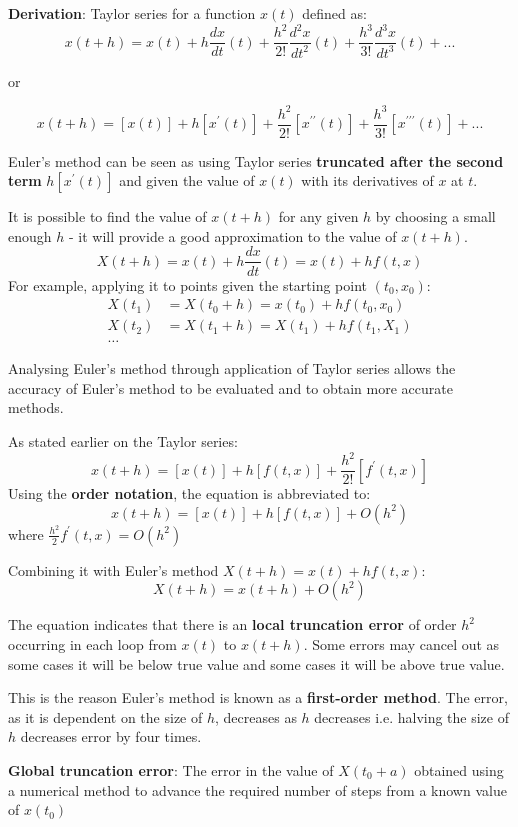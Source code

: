 \documentclass[10pt,a4paper]{article}
\begin{document}
\textbf{Derivation}: Taylor series for a function $x(t)$ defined as:
$$
    x(t+h)=x(t)+h\frac{dx}{dt}(t)+\frac{h^2}{2!}\frac{d^2x}{dt^2}(t)+\frac{h^3}{3!}\frac{d^3x}{dt^3}(t)+...
$$
\begin{center}
    or
\end{center}
$$
    x(t+h)=[x(t)]+h[x^\prime(t)]+\frac{h^2}{2!}[x^{\prime \prime}(t)]+\frac{h^3}{3!}[x^{\prime \prime \prime}(t)]+...
$$

Euler's method can be seen as using Taylor series \textbf{truncated after the second term} 
$h[x^{\prime}(t)]$ and given the value of $x(t)$ with its derivatives
of $x$ at $t$. 

It is possible to find the value of $x(t+h)$ for any given $h$ by choosing a small 
enough $h$ - it will provide a good approximation to the value of $x(t+h)$.
$$
    X(t+h) = x(t) + h\frac{dx}{dt}(t) = x(t) + hf(t,x)
$$
For example, applying it to points given the starting point $(t_0, x_0)$:
\begin{align*}
    X(t_1)&=X(t_0 + h) = x(t_0)+hf(t_0,x_0) \\
    X(t_2)&=X(t_1+h)=X(t_1)+hf(t_1,X_1) \\
    \dots
\end{align*}

Analysing Euler's method through application of Taylor series allows the accuracy of Euler's method
to be evaluated and to obtain more accurate methods. 

As stated earlier on the Taylor series:
$$
    x(t+h)=[x(t)]+h[f(t,x)]+\frac{h^2}{2!}[f^\prime (t,x)]
$$
Using the \textbf{order notation}, the equation is abbreviated to:
$$
    x(t+h)=[x(t)]+h[f(t,x)]+O(h^2)
$$
where $\frac{h^2}{2}f^\prime(t,x)=O(h^2)$

Combining it with Euler's method $X(t+h) = x(t) + hf(t,x)$:
$$
    X(t+h) = x(t+h) + O(h^2)
$$

The equation indicates that there is an \textbf{local truncation error} of order $h^2$ occurring in
each loop from $x(t)$ to $x(t+h)$. Some errors may cancel out as some cases it will be below true
value and some cases it will be above true value.

This is the reason Euler's method is known as a \textbf{first-order method}. The error, as it is 
dependent on the size of $h$, decreases as $h$ decreases i.e. halving the size of $h$ decreases
error by four times. 

\begin{tcolorbox}[breakable,colback=white,colframe=black,width=\dimexpr\textwidth+12mm\relax,enlarge left by=-6mm]
\textbf{Global truncation error}: The error in the value of $X(t_0 + a)$ obtained using a numerical
method to advance the required number of steps from a known value of $x(t_0)$
\end{tcolorbox}
\end{document}
